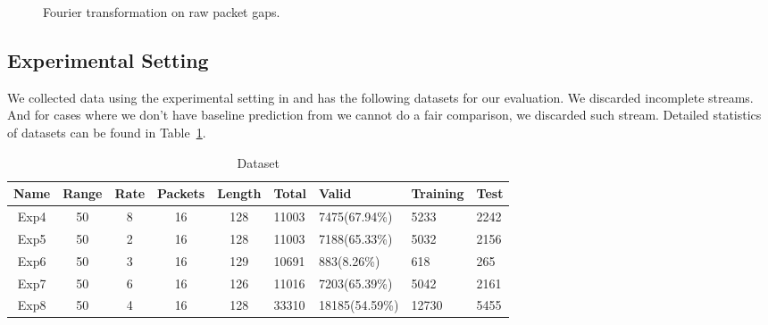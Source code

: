 \begin{figure}[htpb]
   \centering
   \quad
   \caption{Fourier transformation on raw packet gaps.}
   \label{fig:fft}
\end{figure}

\subsection{Experimental Setting}
\label{sub:parameter_setting}

We collected data using the experimental setting in \cite{Yin2014} and has the
following datasets for our evaluation. We discarded incomplete streams. And for
cases where we don't have baseline prediction from \cite{Yin2014} we cannot do
a fair comparison, we discarded such stream. Detailed statistics of datasets
can be found in Table~\ref{tab:dataset}.

\begin{table}[htpb]
   \centering
   \caption{Dataset}
   \label{tab:dataset}
   \begin{tabular}{|c|c|c|c|c|l|l|l|l|}
      \hline
      Name & Range & Rate & Packets & Length & Total & Valid          & Training & Test\\ \hline
      Exp4 & 50    & 8    & 16      & 128    & 11003 & 7475(67.94\%)  & 5233     & 2242 \\
      Exp5 & 50    & 2    & 16      & 128    & 11003 & 7188(65.33\%)  & 5032     & 2156 \\
      Exp6 & 50    & 3    & 16      & 129    & 10691 & 883(8.26\%)    & 618      & 265 \\
      Exp7 & 50    & 6    & 16      & 126    & 11016 & 7203(65.39\%)  & 5042     & 2161 \\
      Exp8 & 50    & 4    & 16      & 128    & 33310 & 18185(54.59\%) & 12730    & 5455  \\ \hline
   \end{tabular}
\end{table}

